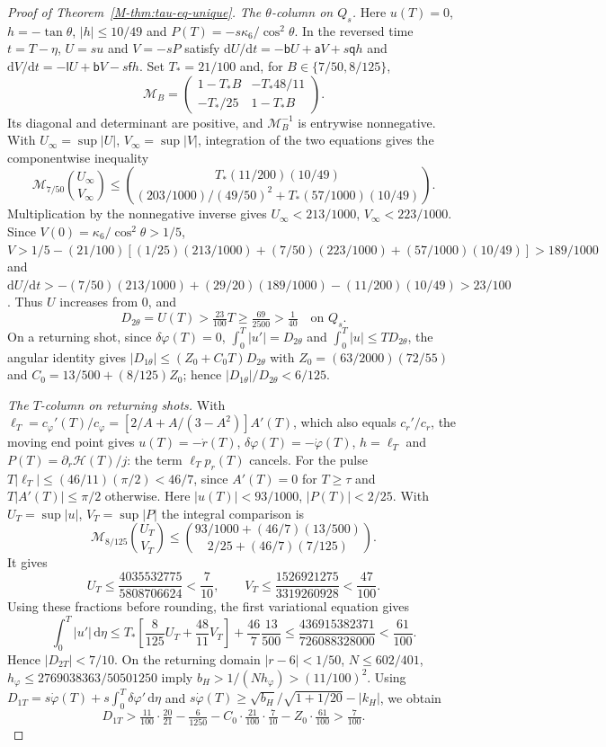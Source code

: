 \documentclass[aip,jmp,amsmath,amssymb,reprint]{revtex4-2}
\newcommand{\dd}{\mathrm{d}}
\theoremstyle{plain}
\theoremstyle{definition}
\begin{document}
\begin{proof}[Proof of Theorem~\ref{M-thm:tau-eq-unique}]
\emph{The $\theta$-column on $Q_s$.} Here $u(T)=0$, $h=-\tan\theta$, $|h|\le10/49$ and
$P(T)=-s\kappa_6/\cos^2\theta$. In the reversed time $t=T-\eta$, $U=su$ and $V=-sP$ satisfy
$\dd U/\dd t=-\mathsf bU+\mathsf aV+s\mathsf qh$ and
$\dd V/\dd t=-\mathsf lU+\mathsf bV-s\mathsf fh$.
Set $T_*=21/100$ and, for $B\in\{7/50,8/125\}$,
\[
 \mathcal M_B=\begin{pmatrix}
 1-T_*B&-T_*48/11\\-T_*/25&1-T_*B
 \end{pmatrix}.
\]
Its diagonal and determinant are positive, and $\mathcal M_B^{-1}$ is
entrywise nonnegative. With $U_\infty=\sup|U|$, $V_\infty=\sup|V|$,
integration of the two equations gives the componentwise inequality
\[
 \mathcal M_{7/50}\binom{U_\infty}{V_\infty}
 \le\binom{T_*(11/200)(10/49)}
 {(203/1000)/(49/50)^2+T_*(57/1000)(10/49)}.
\]
Multiplication by the nonnegative inverse gives
$U_\infty<213/1000$, $V_\infty<223/1000$.
Since $V(0)=\kappa_6/\cos^2\theta>1/5$,
$V>1/5-(21/100)[(1/25)(213/1000)+(7/50)(223/1000)
+(57/1000)(10/49)]>189/1000$
and $\dd U/\dd t>-(7/50)(213/1000)+(29/20)(189/1000)-(11/200)(10/49)>23/100$. Thus $U$ increases from $0$, and
\[
  D_{2\theta}=U(T)>\tfrac{23}{100}T\ge\tfrac{69}{2500}>\tfrac1{40}\quad\text{on }Q_s .
\]
On a returning shot, since $\delta\varphi(T)=0$, $\int_0^T|u'|=D_{2\theta}$ and $\int_0^T|u|\le TD_{2\theta}$, the angular
identity gives $|D_{1\theta}|\le(Z_0+C_0T)D_{2\theta}$ with $Z_0=(63/2000)(72/55)$ and
$C_0=13/500+(8/125)Z_0$; hence $|D_{1\theta}|/D_{2\theta}<6/125$.

\emph{The $T$-column on returning shots.} With $\ell_T=c_\varphi'(T)/c_\varphi=[2/A+A/(3-A^2)]A'(T)$, which also
equals $c_r'/c_r$, the moving end point gives $u(T)=-\dot r(T)$, $\delta\varphi(T)=-\dot\varphi(T)$, $h=\ell_T$ and
$P(T)=\partial_r\mathcal H(T)/j$: the term $\ell_Tp_r(T)$ cancels. For the pulse $T|\ell_T|\le(46/11)(\pi/2)<46/7$,
since $A'(T)=0$ for $T\ge\tau$ and $T|A'(T)|\le\pi/2$ otherwise.
Here $|u(T)|<93/1000$, $|P(T)|<2/25$. With
$U_T=\sup|u|$, $V_T=\sup|P|$ the integral comparison is
\[
 \mathcal M_{8/125}\binom{U_T}{V_T}
 \le\binom{93/1000+(46/7)(13/500)}{2/25+(46/7)(7/125)}.
\]
It gives
\[
 U_T\le\frac{4035532775}{5808706624}<\frac7{10},\qquad
 V_T\le\frac{1526921275}{3319260928}<\frac{47}{100}.
\]
Using these fractions before rounding, the first variational equation gives
\[
 \int_0^T|u'|\,\dd\eta
 \le T_*\left[\frac8{125}U_T+\frac{48}{11}V_T\right]
       +\frac{46}{7}\frac{13}{500}
 \le\frac{436915382371}{726088328000}<\frac{61}{100}.
\]
Hence $|D_{2T}|<7/10$. On the returning domain $|r-6|<1/50$,
$N\le602/401$, $h_\varphi\le2769038363/50501250$ imply
$b_H>1/(Nh_\varphi)>(11/100)^2$.
Using $D_{1T}=s\dot\varphi(T)+s\int_0^T\delta\varphi'\,\dd\eta$ and
$s\dot\varphi(T)\ge\sqrt{b_H}/\sqrt{1+1/20}-|k_H|$, we obtain
\[
  D_{1T}>\tfrac{11}{100}\cdot\tfrac{20}{21}-\tfrac6{1250}-C_0\cdot\tfrac{21}{100}\cdot\tfrac7{10}-Z_0\cdot\tfrac{61}{100}>\tfrac7{100}.
\]


\end{proof}
\end{document}
